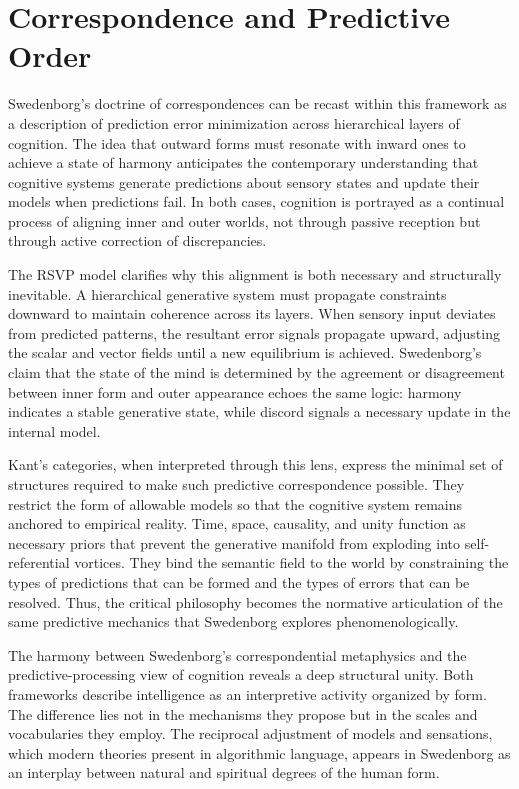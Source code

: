 \documentclass[12pt]{article}
\begin{document}
\section{Correspondence and Predictive Order}

Swedenborg’s doctrine of correspondences can be recast within this framework as 
a description of prediction error minimization across hierarchical layers of 
cognition. The idea that outward forms must resonate with inward ones to achieve 
a state of harmony anticipates the contemporary understanding that cognitive 
systems generate predictions about sensory states and update their models when 
predictions fail. In both cases, cognition is portrayed as a continual process 
of aligning inner and outer worlds, not through passive reception but through 
active correction of discrepancies.

The RSVP model clarifies why this alignment is both necessary and 
structurally inevitable. A hierarchical generative system must propagate 
constraints downward to maintain coherence across its layers. When sensory 
input deviates from predicted patterns, the resultant error signals propagate 
upward, adjusting the scalar and vector fields until a new equilibrium is 
achieved. Swedenborg’s claim that the state of the mind is determined by the 
agreement or disagreement between inner form and outer appearance echoes the 
same logic: harmony indicates a stable generative state, while discord signals 
a necessary update in the internal model.

Kant’s categories, when interpreted through this lens, express the minimal set 
of structures required to make such predictive correspondence possible. They 
restrict the form of allowable models so that the cognitive system remains 
anchored to empirical reality. Time, space, causality, and unity function as 
necessary priors that prevent the generative manifold from exploding into 
self-referential vortices. They bind the semantic field to the world by 
constraining the types of predictions that can be formed and the types of 
errors that can be resolved. Thus, the critical philosophy becomes the 
normative articulation of the same predictive mechanics that Swedenborg explores 
phenomenologically.

The harmony between Swedenborg’s correspondential metaphysics and the 
predictive-processing view of cognition reveals a deep structural unity. Both 
frameworks describe intelligence as an interpretive activity organized by form.  
The difference lies not in the mechanisms they propose but in the scales and 
vocabularies they employ. The reciprocal adjustment of models and sensations, 
which modern theories present in algorithmic language, appears in Swedenborg 
as an interplay between natural and spiritual degrees of the human form.
\end{document}
